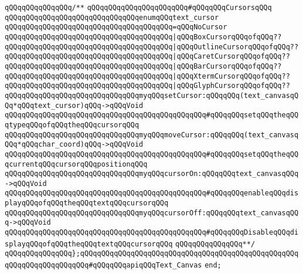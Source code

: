 \newline
\verb|qQQqqQQqqQQqqQQq/**|\newline
\verb|qQQqqQQqqQQqqQQqqQQqqQQq#qQQqqQQqCursorsqQQq|\newline
\verb|qQQqqQQqqQQqqQQqqQQqqQQqqQQqqQQqenumqQQqtext_cursor|\newline
\verb|qQQqqQQqqQQqqQQqqQQqqQQqqQQqqQQqqQQqqQQq=qQQqNoCursor|\newline
\verb|qQQqqQQqqQQqqQQqqQQqqQQqqQQqqQQqqQQqqQQq|\verb#|qQQqBoxCursorqQQqofqQQq??#\newline
\verb|qQQqqQQqqQQqqQQqqQQqqQQqqQQqqQQqqQQqqQQq|\verb#|qQQqOutlineCursorqQQqofqQQq??#\newline
\verb|qQQqqQQqqQQqqQQqqQQqqQQqqQQqqQQqqQQqqQQq|\verb#|qQQqCaretCursorqQQqofqQQq??#\newline
\verb|qQQqqQQqqQQqqQQqqQQqqQQqqQQqqQQqqQQqqQQq|\verb#|qQQqBarCursorqQQqofqQQq??#\newline
\verb|qQQqqQQqqQQqqQQqqQQqqQQqqQQqqQQqqQQqqQQq|\verb#|qQQqXtermCursorqQQqofqQQq??#\newline
\verb|qQQqqQQqqQQqqQQqqQQqqQQqqQQqqQQqqQQqqQQq|\verb#|qQQqGlyphCursorqQQqofqQQq??#\newline
\newline
\verb|qQQqqQQqqQQqqQQqqQQqqQQqqQQqqQQqmyqQQqsetCursor:qQQqqQQq(text_canvasqQQq*qQQqtext_cursor)qQQq->qQQqVoid|\newline
\verb|qQQqqQQqqQQqqQQqqQQqqQQqqQQqqQQqqQQqqQQqqQQqqQQq#qQQqqQQqsetqQQqtheqQQqtypeqQQqofqQQqtheqQQqcursorqQQq|\newline
\newline
\verb|qQQqqQQqqQQqqQQqqQQqqQQqqQQqqQQqmyqQQqmoveCursor:qQQqqQQq(text_canvasqQQq*qQQqchar_coord)qQQq->qQQqVoid|\newline
\verb|qQQqqQQqqQQqqQQqqQQqqQQqqQQqqQQqqQQqqQQqqQQqqQQq#qQQqqQQqsetqQQqtheqQQqcurrentqQQqcursorqQQqpositionqQQq|\newline
\newline
\verb|qQQqqQQqqQQqqQQqqQQqqQQqqQQqqQQqmyqQQqcursorOn:qQQqqQQqtext_canvasqQQq->qQQqVoid|\newline
\verb|qQQqqQQqqQQqqQQqqQQqqQQqqQQqqQQqqQQqqQQqqQQqqQQq#qQQqqQQqenableqQQqdisplayqQQqofqQQqtheqQQqtextqQQqcursorqQQq|\newline
\newline
\verb|qQQqqQQqqQQqqQQqqQQqqQQqqQQqqQQqmyqQQqcursorOff:qQQqqQQqtext_canvasqQQq->qQQqVoid|\newline
\verb|qQQqqQQqqQQqqQQqqQQqqQQqqQQqqQQqqQQqqQQqqQQqqQQq#qQQqqQQqDisableqQQqdisplayqQQqofqQQqtheqQQqtextqQQqcursorqQQq|\newline
\verb|qQQqqQQqqQQqqQQq**/|\newline
\newline
\verb|qQQqqQQqqQQqqQQq};qQQqqQQqqQQqqQQqqQQqqQQqqQQqqQQqqQQqqQQqqQQqqQQqqQQqqQQqqQQqqQQqqQQqqQQq#qQQqqQQqapiqQQqText_Canvas|\newline
\newline
\verb|end;|\newline

